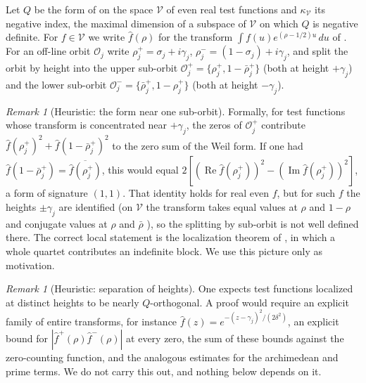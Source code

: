 \documentclass[11pt]{amsart}
\theoremstyle{definition}
\theoremstyle{remark}
\newtheorem{remark}[theorem]{Remark}
\renewcommand{\Re}{\operatorname{Re}}
\renewcommand{\Im}{\operatorname{Im}}
\newcommand{\fhat}{\widehat f}
\begin{document}
Let $Q$ be the form of \cite{Index} on the space $\mathcal V$ of even real test functions and
$\kappa_{\mathcal V}$ its negative index, the maximal dimension of a subspace of $\mathcal V$ on
which $Q$ is negative definite. For $f\in\mathcal V$ we write $\fhat(\rho)$ for the transform $\int f(u)e^{(\rho-1/2)u}\,du$ of \cite{Index}. For an
off-line orbit $\mathcal O_j$ write $\rho_j^+=\sigma_j+i\gamma_j$, $\rho_j^-=(1-\sigma_j)+
i\gamma_j$, and split the orbit by height into the upper sub-orbit $\mathcal O_j^+=\{\rho_j^+,
1-\bar\rho_j^+\}$ (both at height $+\gamma_j$) and the lower sub-orbit $\mathcal O_j^-=\{
\bar\rho_j^+,1-\rho_j^+\}$ (both at height $-\gamma_j$).

\begin{remark}[Heuristic: the form near one sub-orbit]\label{prop:restricted}
Formally, for test functions whose transform is concentrated near $+\gamma_j$, the zeros of
$\mathcal O_j^+$ contribute $\fhat(\rho_j^+)^2+\fhat(1-\bar\rho_j^+)^2$ to the zero sum of the
Weil form. If one had $\fhat(1-\bar\rho_j^+)=\overline{\fhat(\rho_j^+)}$, this would equal
$2[(\Re\fhat(\rho_j^+))^2-(\Im\fhat(\rho_j^+))^2]$, a form of signature $(1,1)$. That identity
holds for real even $f$, but for such $f$ the heights $\pm\gamma_j$ are identified
(on $\mathcal V$ the transform takes equal values at $\rho$ and $1-\rho$ and conjugate values at $\rho$ and $\bar\rho$ \cite[Lemma~2.3]{Index}), so the splitting by sub-orbit is not well defined there. The correct
local statement is the localization theorem of \cite[Thm.~3.1]{Index}, in which a whole
quartet contributes an indefinite block. We use this picture only as motivation.
\end{remark}

\begin{remark}[Heuristic: separation of heights]\label{prop:orth}
One expects test functions localized at distinct heights to be nearly $Q$-orthogonal. A proof
would require an explicit family of entire transforms, for instance
$\fhat(z)=e^{-(z-\gamma_j)^2/(2\delta^2)}$, an explicit bound for $|\fhat^+(\rho)\fhat^-(\rho)|$
at every zero, the sum of these bounds against the zero-counting function, and the analogous
estimates for the archimedean and prime terms. We do not carry this out, and nothing below
depends on it.
\end{remark}
\end{document}
